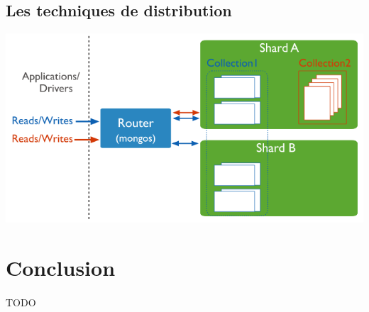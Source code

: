 \documentclass{article}
\begin{document}
\subsection{Les techniques de distribution}
  \includegraphics[scale=0.7]{mongodb/sharded-mongodb.png}\\

\newpage
\section{Conclusion}
  \paragraph{} TODO
  
\end{document}
